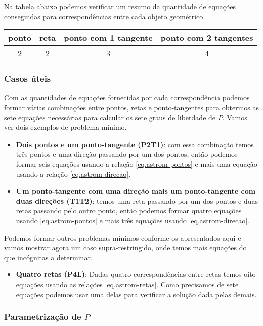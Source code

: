 Na tabela abaixo podemos verificar um resumo da quantidade de equações conseguidas para correspondências entre cada objeto geométrico.
\begin{center}
\begin{tabular}{|c|c|c|c|}
\hline 
{\bf ponto} & {\bf reta} & {\bf ponto com 1 tangente} & {\bf ponto com 2 tangentes} \\ 
\hline 
2 & 2 & 3 & 4 \\ 
\hline 
\end{tabular} 
\end{center}

\subsubsection*{Casos úteis}

Com as quantidades de equações fornecidas por cada correspondência podemos formar várias combinações entre pontos, retas e ponto-tangentes para obtermos as sete equações necessárias para calcular os sete graus de liberdade de $P$. Vamos ver dois exemplos de problema mínimo.
\begin{itemize}
\item {\bf Dois pontos e um ponto-tangente (P2T1)}: com essa combinação temos três pontos e uma direção passando por um dos pontos, então podemos formar seis equações usando a relação \ref{eq.astrom-pontos} e mais uma equação usando a relação \ref{eq.astrom-direcao}. 

\item {\bf Um ponto-tangente com uma direção mais um ponto-tangente com duas direções (T1T2)}: temos uma reta passando por um dos pontos e duas retas passando pelo outro ponto, então podemos formar quatro equações usando \ref{eq.astrom-pontos} e mais três equações usando \ref{eq.astrom-direcao}.
\end{itemize} 

Podemos formar outros problemas mínimos conforme os apresentados aqui e vamos mostrar agora um caso supra-restringido, onde temos mais equações do que incógnitas a determinar.
\begin{itemize}
\item {\bf Quatro retas (P4L)}: Dadas quatro correspondências entre retas temos oito equações usando as relações \ref{eq.astrom-retas}. Como precisamos de sete equações podemos usar uma delas para verificar a solução dada pelas demais.
\end{itemize}

\subsubsection*{Parametrização de $P$}

